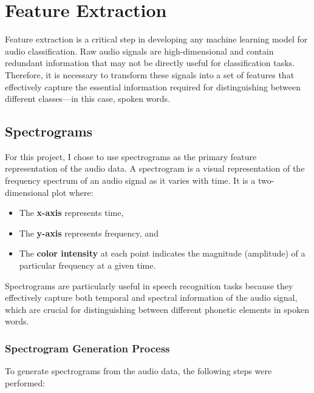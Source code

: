 \documentclass[12pt]{article}
\begin{document}
\section{Feature Extraction}

Feature extraction is a critical step in developing any machine learning model for audio classification. Raw audio signals are high-dimensional and contain redundant information that may not be directly useful for classification tasks. Therefore, it is necessary to transform these signals into a set of features that effectively capture the essential information required for distinguishing between different classes—in this case, spoken words.

\subsection{Spectrograms}

For this project, I chose to use spectrograms as the primary feature representation of the audio data. A spectrogram is a visual representation of the frequency spectrum of an audio signal as it varies with time. It is a two-dimensional plot where:

\begin{itemize}
\item The \textbf{x-axis} represents time,
\item The \textbf{y-axis} represents frequency, and
\item The \textbf{color intensity} at each point indicates the magnitude (amplitude) of a particular frequency at a given time.
\end{itemize}

Spectrograms are particularly useful in speech recognition tasks because they effectively capture both temporal and spectral information of the audio signal, which are crucial for distinguishing between different phonetic elements in spoken words.

\subsubsection{Spectrogram Generation Process}

To generate spectrograms from the audio data, the following steps were performed:
\end{document}
